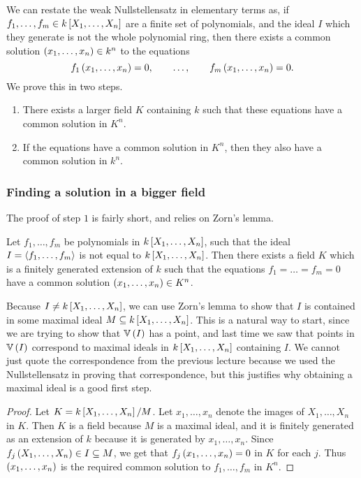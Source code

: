 
We can restate the weak Nullstellensatz in elementary terms as, if $ f_1, \dots, f_m \in k\sbr{X_1, \dots, X_n} $ are a finite set of polynomials, and the ideal $ I $ which they generate is not the whole polynomial ring, then there exists a common solution $ \br{x_1, \dots, x_n} \in k^n $ to the equations
$$ f_1\br{x_1, \dots, x_n} = 0, \qquad \dots, \qquad f_m\br{x_1, \dots, x_n} = 0. $$
We prove this in two steps.
\begin{enumerate}[leftmargin=0.5in, label=Step \arabic*.]
\item There exists a larger field $ K $ containing $ k $ such that these equations have a common solution in $ K^n $.
\item If the equations have a common solution in $ K^n $, then they also have a common solution in $ k^n $.
\end{enumerate}

\subsubsection{Finding a solution in a bigger field}

The proof of step $ 1 $ is fairly short, and relies on Zorn's lemma.

\begin{lemma}
Let $ f_1, \dots, f_m $ be polynomials in $ k\sbr{X_1, \dots, X_n} $, such that the ideal $ I = \left\langle f_1, \dots, f_m \right\rangle $ is not equal to $ k\sbr{X_1, \dots, X_n} $. Then there exists a field $ K $ which is a finitely generated extension of $ k $ such that the equations $ f_1 = \dots = f_m = 0 $ have a common solution $ \br{x_1, \dots, x_n} \in K^n $.
\end{lemma}

Because $ I \ne k\sbr{X_1, \dots, X_n} $, we can use Zorn's lemma to show that $ I $ is contained in some maximal ideal $ M \subseteq k\sbr{X_1, \dots, X_n} $. This is a natural way to start, since we are trying to show that $ \VV\br{I} $ has a point, and last time we saw that points in $ \VV\br{I} $ correspond to maximal ideals in $ k\sbr{X_1, \dots, X_n} $ containing $ I $. We cannot just quote the correspondence from the previous lecture because we used the Nullstellensatz in proving that correspondence, but this justifies why obtaining a maximal ideal is a good first step.

\begin{proof}
Let $ K = k\sbr{X_1, \dots, X_n} / M $. Let $ x_1, \dots, x_n $ denote the images of $ X_1, \dots, X_n $ in $ K $. Then $ K $ is a field because $ M $ is a maximal ideal, and it is finitely generated as an extension of $ k $ because it is generated by $ x_1, \dots, x_n $. Since $ f_j\br{X_1, \dots, X_n} \in I \subseteq M $, we get that $ f_j\br{x_1, \dots, x_n} = 0 $ in $ K $ for each $ j $. Thus $ \br{x_1, \dots, x_n} $ is the required common solution to $ f_1, \dots, f_m $ in $ K^n $.
\end{proof}


